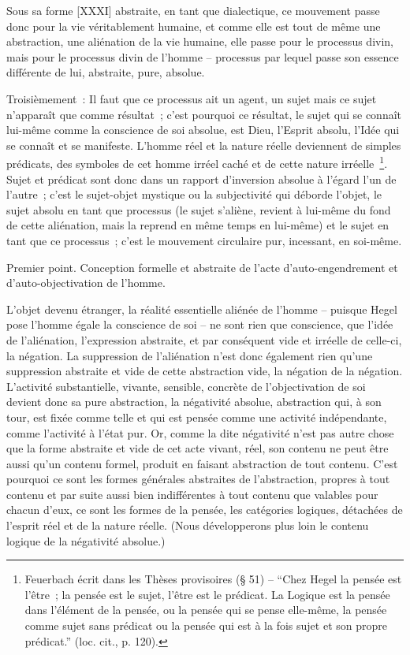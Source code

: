 \documentclass[french,twoside]{book} %
\begin{document}
Sous sa forme [XXXI] abstraite, en tant que dialectique, ce mouvement passe donc pour la vie véritablement humaine, et comme elle est tout de même une abstraction, une aliénation de la vie humaine, elle passe pour le processus divin, mais pour le processus divin de l’homme – processus par lequel passe son essence différente de lui, abstraite, pure, absolue.\par
Troisièmement : Il faut que ce processus ait un agent, un sujet mais ce sujet n’apparaît que comme résultat ; c’est pourquoi ce résultat, le sujet qui se connaît lui-même comme la conscience de soi absolue, est Dieu, l’Esprit absolu, l’Idée qui se connaît et se manifeste. L’homme réel et la nature réelle deviennent de simples prédicats, des symboles de cet homme irréel caché et de cette nature irréelle \footnote{Feuerbach écrit dans les Thèses provisoires (§ 51) – “Chez Hegel la pensée est l’être ; la pensée est le sujet, l’être est le prédicat. La Logique est la pensée dans l’élément de la pensée, ou la pensée qui se pense elle-même, la pensée comme sujet sans prédicat ou la pensée qui est à la fois sujet et son propre prédicat.” (loc. cit., p. 120).}. Sujet et prédicat sont donc dans un rapport d’inversion absolue à l’égard l’un de l’autre ; c’est le sujet-objet mystique ou la subjectivité qui déborde l’objet, le sujet absolu en tant que processus (le sujet s’aliène, revient à lui-même du fond de cette aliénation, mais la reprend en même temps en lui-même) et le sujet en tant que ce processus ; c’est le mouvement circulaire pur, incessant, en soi-même.\par
Premier point. Conception formelle et abstraite de l’acte d’auto-engendrement et d’auto-objectivation de l’homme.\par
L’objet devenu étranger, la réalité essentielle aliénée de l’homme – puisque Hegel pose l’homme égale la conscience de soi – ne sont rien que conscience, que l’idée de l’aliénation, l’expression abstraite, et par conséquent vide et irréelle de celle-ci, la négation. La suppression de l’aliénation n’est donc également rien qu’une suppression abstraite et vide de cette abstraction vide, la négation de la négation. L’activité substantielle, vivante, sensible, concrète de l’objectivation de soi devient donc sa pure abstraction, la négativité absolue, abstraction qui, à son tour, est fixée comme telle et qui est pensée comme une activité indépendante, comme l’activité à l’état pur. Or, comme la dite négativité n’est pas autre chose que la forme abstraite et vide de cet acte vivant, réel, son contenu ne peut être aussi qu’un contenu formel, produit en faisant abstraction de tout contenu. C’est pourquoi ce sont les formes générales abstraites de l’abstraction, propres à tout contenu et par suite aussi bien indifférentes à tout contenu que valables pour chacun d’eux, ce sont les formes de la pensée, les catégories logiques, détachées de l’esprit réel et de la nature réelle. (Nous développerons plus loin le contenu logique de la négativité absolue.)\par
\end{document}
